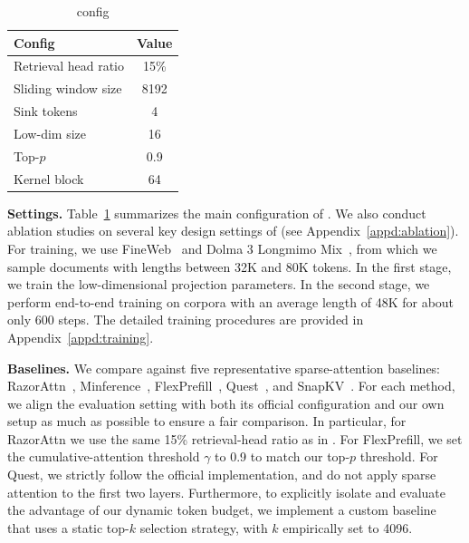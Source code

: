\begin{table}
    \vspace{-1.0em}
    \centering
    \scriptsize
    \setlength{\tabcolsep}{3pt}
    \renewcommand{\arraystretch}{0.95}
    \captionsetup{width=\linewidth, justification=centering, singlelinecheck=true, skip=2pt}
    \caption{\name config}
    \label{tab:exp_settings}
    \begin{tabular*}{\linewidth}{@{\extracolsep{\fill}}lc@{}}
        \toprule
        \textbf{Config} & \textbf{Value} \\
        \midrule
        Retrieval head ratio & 15\% \\
        Sliding window size & 8192 \\
        Sink tokens & 4 \\
        Low-dim size & 16 \\
        Top-$p$ & 0.9 \\
        Kernel block & 64 \\
        \bottomrule
    \end{tabular*}
    \vspace{-1.0em}
\end{table}
\noindent\textbf{Settings.} Table~\ref{tab:exp_settings} summarizes the main configuration of \name. 
 We also conduct ablation studies on several key design settings of \name (see Appendix~\ref{appd:ablation}). For training, we use FineWeb~\citep{fineweb} and Dolma 3 Longmimo Mix~\citep{olmo2026olmo3}, from which we sample documents with lengths between 32K and 80K tokens. In the first stage, we train the low-dimensional projection parameters. In the second stage, we perform end-to-end training on corpora with an average length of 48K for about only 600 steps. The detailed training procedures are provided in Appendix~\ref{appd:training}.


\noindent\textbf{Baselines.} We compare \name against five representative sparse-attention baselines: RazorAttn~\citep{razorattn}, Minference~\citep{minference}, FlexPrefill~\citep{flexprefill}, Quest~\citep{Quest}, and SnapKV~\citep{snapkv}. For each method, we align the evaluation setting with both its official configuration and our own setup as much as possible to ensure a fair comparison. In particular, for RazorAttn we use the same 15\% retrieval-head ratio as in \name. For FlexPrefill, we set the cumulative-attention threshold $\gamma$ to 0.9 to match our top-$p$ threshold. For Quest, we strictly follow the official implementation, and do not apply sparse attention to the first two layers. Furthermore, to explicitly isolate and evaluate the advantage of our dynamic token budget, we implement a custom baseline that uses a static top-$k$ selection strategy, with $k$ empirically set to 4096.

